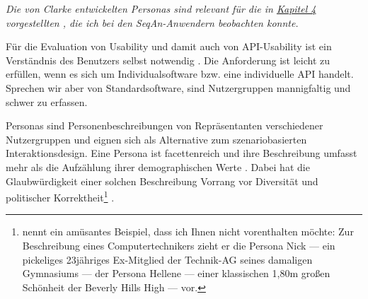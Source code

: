 \begin{important}
\textit{Die von Clarke entwickelten Personas sind relevant für die in \href{sec:Ergebnisse}{Kapitel 4} vorgestellten , die ich bei den SeqAn-Anwendern beobachten konnte.}

Für die Evaluation von Usability und damit auch von API-Usability ist ein Verständnis des Benutzers selbst notwendig \citep{Sarodnick:2006vc}. Die Anforderung ist leicht zu erfüllen, wenn es sich um Individualsoftware bzw. eine individuelle API handelt. Sprechen wir aber von Standardsoftware, sind Nutzergruppen mannigfaltig und schwer zu erfassen.

Personas sind Personenbeschreibungen von Repräsentanten verschiedener Nutzergruppen und eignen sich als Alternative zum szenariobasierten Interaktionsdesign. Eine Persona ist facettenreich und ihre Beschreibung umfasst mehr als die Aufzählung ihrer demographischen Werte \citep{Pruitt:2003ki}. Dabei hat die Glaubwürdigkeit einer solchen Beschreibung Vorrang vor Diversität und politischer Korrektheit\footnote{\cite{Cooper:1999vg} nennt ein amüsantes Beispiel, dass ich Ihnen nicht vorenthalten möchte: Zur Beschreibung eines Computertechnikers zieht er die Persona Nick --- ein pickeliges 23jähriges Ex-Mitglied der Technik-AG seines damaligen Gymnasiums --- der Persona Hellene --- einer klassischen 1,80m großen Schönheit der Beverly Hills High --- vor.} \citep{Cooper:1999vg}.


\end{important}
